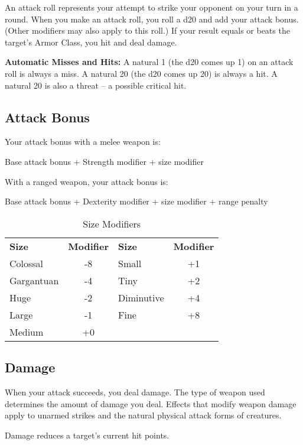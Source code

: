 An attack roll represents your attempt to strike your opponent on your turn in 
a round. When you make an attack roll, you roll a d20 and add your attack bonus. 
(Other modifiers may also apply to this roll.) If your result equals or beats the 
target's Armor Class, you hit and deal damage.

\textbf{Automatic Misses and Hits:} A natural 1 (the d20 comes up 1) on an attack 
roll is always a miss. A natural 20 (the d20 comes up 20) is always a hit. A natural 
20 is also a threat -- a possible critical hit.

\subsection{Attack Bonus}

Your attack bonus with a melee weapon is:

Base attack bonus + Strength modifier + size modifier

With a ranged weapon, your attack bonus is:

Base attack bonus + Dexterity modifier + size modifier + range penalty

\begin{table}[htb]
\caption{Size Modifiers}
\centering
\begin{tabular}{l c l c}
\textbf{Size} & \textbf{Modifier} & \textbf{Size} & \textbf{Modifier} \\
Colossal & -8 & Small & +1\\
Gargantuan & -4 & Tiny & +2\\
Huge & -2 & Diminutive & +4\\
Large & -1 & Fine & +8\\
Medium & +0 & &\\
\end{tabular}
\end{table}

\subsection{Damage}

When your attack succeeds, you deal damage. The type of weapon used determines 
the amount of damage you deal. Effects that modify weapon damage apply to unarmed 
strikes and the natural physical attack forms of creatures.

Damage reduces a target's current hit points.

